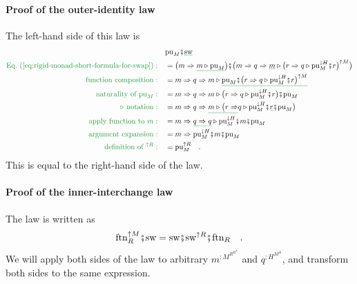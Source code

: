 \paragraph{Proof of the outer-identity law}

The left-hand side of this law is
\begin{align*}
 & \text{pu}_{M}\bef\gunderline{\text{sw}}\\
{\color{greenunder}\text{Eq.~(\ref{eq:rigid-monad-short-formula-for-swap})}:}\quad & =\big(m\Rightarrow\gunderline{m\triangleright\text{pu}_{M}}\big)\bef\big(m\Rightarrow q\Rightarrow\gunderline m\triangleright\big(r\Rightarrow q\triangleright\text{pu}_{M}^{\downarrow H}\bef r\big)^{\uparrow M}\big)\\
{\color{greenunder}\text{function composition}:}\quad & =m\Rightarrow q\Rightarrow m\triangleright\gunderline{\text{pu}_{M}\bef\big(r\Rightarrow q\triangleright\text{pu}_{M}^{\downarrow H}\bef r\big)^{\uparrow M}}\\
{\color{greenunder}\text{naturality of }\text{pu}_{M}:}\quad & =m\Rightarrow q\Rightarrow m\triangleright\big(r\Rightarrow q\triangleright\text{pu}_{M}^{\downarrow H}\bef r\big)\bef\text{pu}_{M}\\
{\color{greenunder}\triangleright\text{ notation}:}\quad & =m\Rightarrow q\Rightarrow\gunderline{m\triangleright\big(r\Rightarrow}q\triangleright\text{pu}_{M}^{\downarrow H}\bef\gunderline r\bef\text{pu}_{M}\big)\\
{\color{greenunder}\text{apply function to }m:}\quad & =m\Rightarrow\gunderline{q\Rightarrow q}\triangleright\text{pu}_{M}^{\downarrow H}\bef m\bef\text{pu}_{M}\\
{\color{greenunder}\text{argument expansion}:}\quad & =m\Rightarrow\text{pu}_{M}^{\downarrow H}\bef m\bef\text{pu}_{M}\\
{\color{greenunder}\text{definition of }{}^{\uparrow R}:}\quad & =\text{pu}_{M}^{\uparrow R}\quad.
\end{align*}
This is equal to the right-hand side of the law.

\paragraph{Proof of the inner-interchange law}

The law is written as
\begin{equation}
\vspace{-0.25cm}\text{ftn}_{R}^{\uparrow M}\bef\text{sw}=\text{sw}\bef\text{sw}^{\uparrow R}\bef\text{ftn}_{R}\quad.\label{eq:swap-law-3-formulation-R-M}
\end{equation}
We will apply both sides of the law to arbitrary $m^{:M^{R^{R^{A}}}}$
and $q^{:H^{M^{A}}}$, and transform both sides to the same expression. 

